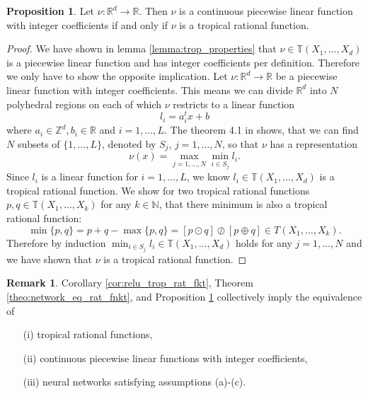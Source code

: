 \documentclass{article}
\theoremstyle{definition}
\newtheorem{proposition}[theorem]{Proposition}
\newtheorem{remark}[theorem]{Remark}
\begin{document}
\begin{proposition}\cite{zhang2018tropical}
\label{prop:plin_trop_fnkt}
Let $\nu : \mathbb{R}^{d} \to \mathbb{R}$. Then $\nu$ is a continuous piecewise linear function with integer coefficients if and only if $\nu$ is a tropical rational function.
\end{proposition}
\begin{proof}
We have shown in lemma \ref{lemma:trop_properties} that $\nu \in \mathbb{T}(X_1, \dots, X_d)$ is a piecewise linear function and has integer coefficients per definition. Therefore we only have to show the opposite implication. Let $\nu : \mathbb{R}^{d} \to \mathbb{R}$ be a piecewise linear function with integer coefficients. This means we can divide $\mathbb{R}^{d}$ into $N$ polyhedral regions on each of which $\nu$ restricts to a linear function
$$l_{i} = a_{i}^{t}x + b$$
where $a_{i} \in \mathbb{Z}^{d}, b_{i} \in \mathbb{R}$ and $i=1, \dots, L$. The theorem 4.1 in \cite{tarela1999region} shows, that we can find $N$ subsets of $\{ 1, \dots , L\}$, denoted by $S_{j}$, $j=1, \dots , N$, so that $\nu$ has a representation
$$\nu (x) = \max_{j=1,\dots,N} \min_{i \in S_j} l_i.$$
Since $l_{i}$ is a linear function for $i=1, \dots, L$, we know $l_i \in \mathbb{T}(X_1, \dots, X_d)$ is a tropical rational function. We show for two tropical rational functions $p,q \in \mathbb{T}(X_1, \dots , X_k)$ for any $k \in \mathbb{N}$, that there minimum is also a tropical rational function:
$$\min\{p,q\} = p + q - \max\{p,q\} = [p \odot q] \oslash [p \oplus q] \in T(X_1, \dots , X_k).$$
Therefore by induction $\min_{i \in S_j} l_i \in \mathbb{T}(X_1, \dots , X_d)$ holds for any $j=1, \dots , N$ and we have shown that $\nu$ is a tropical rational function.
\end{proof}

\begin{remark}\cite{zhang2018tropical}
Corollary \ref{cor:relu_trop_rat_fkt}, Theorem \ref{theo:network_eq_rat_fnkt}, and Proposition \ref{prop:plin_trop_fnkt} collectively imply the equivalence of
\begin{itemize}
\item[(i)]
tropical rational functions,
\item[(ii)]
continuous piecewise linear functions with integer coefficients,
\item[(iii)]
neural networks satisfying assumptions (a)-(c).
\end{itemize}
\end{remark}

\end{document}
